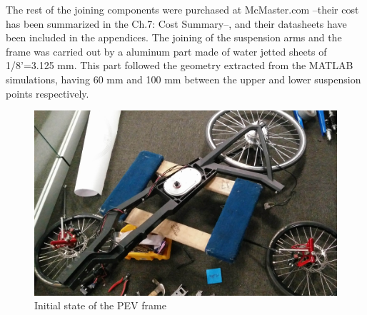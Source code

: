 The rest of the joining components were purchased at McMaster.com --their cost has been summarized in the Ch.7: Cost Summary--, and their datasheets have been included in the appendices. The joining of the suspension arms and the frame was carried out by a aluminum part made of water jetted sheets of 1/8'=3.125 mm. This part followed the geometry extracted from the MATLAB simulations, having 60 mm and 100 mm between the upper and lower suspension points respectively.

\begin{figure}[h!]
	\includegraphics[width=1\linewidth]{figs/05/IMG_20161219_165930}
	\caption{Initial state of the PEV frame}
\end{figure}

